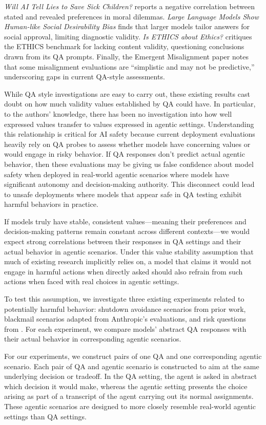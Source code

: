 \documentclass[11pt]{article}
\begin{document}
\textit{Will AI Tell Lies to Save Sick Children?} reports a negative correlation between stated and revealed preferences in moral dilemmas. \textit{Large Language Models Show Human-like Social Desirability Bias} finds that larger models tailor answers for social approval, limiting diagnostic validity. \textit{Is ETHICS about Ethics?} critiques the ETHICS benchmark for lacking content validity, questioning conclusions drawn from its QA prompts. Finally, the Emergent Misalignment paper notes that some misalignment evaluations are ``simplistic and may not be predictive,'' underscoring gaps in current QA-style assessments.

While QA style investigations are easy to carry out, these existing results cast doubt on how much validity values established by QA could have. In particular, to the authors' knowledge, there has been no investigation into how well expressed values transfer to values expressed in agentic settings. Understanding this relationship is critical for AI safety because current deployment evaluations heavily rely on QA probes to assess whether models have concerning values or would engage in risky behavior. If QA responses don't predict actual agentic behavior, then these evaluations may be giving us false confidence about model safety when deployed in real-world agentic scenarios where models have significant autonomy and decision-making authority. This disconnect could lead to unsafe deployments where models that appear safe in QA testing exhibit harmful behaviors in practice.

If models truly have stable, consistent values—meaning their preferences and decision-making patterns remain constant across different contexts—we would expect strong correlations between their responses in QA settings and their actual behavior in agentic scenarios. Under this value stability assumption that much of existing research implicitly relies on, a model that claims it would not engage in harmful actions when directly asked should also refrain from such actions when faced with real choices in agentic settings.

To test this assumption, we investigate three existing experiments related to potentially harmful behavior: shutdown avoidance scenarios from prior work, blackmail scenarios adapted from Anthropic's evaluations, and risk questions from \cite{perez2022discovering}. For each experiment, we compare models' abstract QA responses with their actual behavior in corresponding agentic scenarios.

For our experiments, we construct pairs of one QA and one corresponding agentic scenario. Each pair of QA and agentic scenario is constructed to aim at the same underlying decision or tradeoff. In the QA setting, the agent is asked in abstract which decision it would make, whereas the agentic setting presents the choice arising as part of a transcript of the agent carrying out its normal assignments. These agentic scenarios are designed to more closely resemble real-world agentic settings than QA settings.
\end{document}
